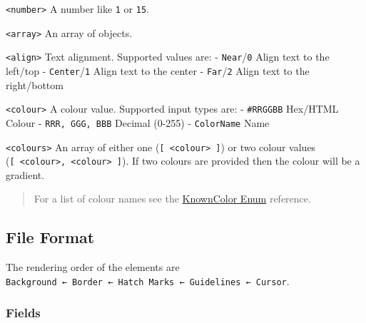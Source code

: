 \documentclass[
]{book}
\begin{document}
\texttt{\textless{}number\textgreater{}} A number like \texttt{1} or \texttt{15}.

\texttt{\textless{}array\textgreater{}} An array of objects.

\texttt{\textless{}align\textgreater{}} Text alignment.
Supported values are:
- \texttt{Near}/\texttt{0} Align text to the left/top
- \texttt{Center}/\texttt{1} Align text to the center
- \texttt{Far}/\texttt{2} Align text to the right/bottom

\texttt{\textless{}colour\textgreater{}} A colour value.
Supported input types are:
- \texttt{\textquotesingle{}\#RRGGBB\textquotesingle{}} Hex/HTML Colour
- \texttt{RRR,\ GGG,\ BBB} Decimal (0-255)
- \texttt{ColorName} Name

\texttt{\textless{}colours\textgreater{}} An array of either one (\texttt{{[}\ \textless{}colour\textgreater{}\ {]}}) or two colour values (\texttt{{[}\ \textless{}colour\textgreater{},\ \textless{}colour\textgreater{}\ {]}}).
If two colours are provided then the colour will be a gradient.

\begin{quote}
For a list of colour names see the \href{https://docs.microsoft.com/en-us/dotnet/api/system.drawing.knowncolor?view=netcore-3.1}{KnownColor Enum} reference.
\end{quote}

\subsection{File Format}\label{file-format}

The rendering order of the elements are \texttt{Background\ ←\ Border\ ←\ Hatch\ Marks\ ←\ Guidelines\ ←\ Cursor}.

\subsubsection{Fields}\label{fields}
\end{document}
